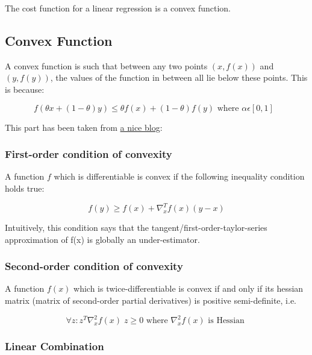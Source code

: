 The cost function for a linear regression is a convex function.

\subsection{Convex Function}

A convex function is such that between any two points $(x, f(x))$ and $(y, f(y))$, the values of the function in between all lie below these points. This is because:

\begin{equation}
    f(\theta x + (1-\theta)y) \leq \theta f(x) + (1-\theta)f(y) \text{ where $\alpha \epsilon [0, 1]$ }
\end{equation}

This part has been taken from \href{http://mathgotchas.blogspot.com/2011/10/why-is-error-function-minimized-in.html}{a nice blog}:

\subsubsection{First-order condition of convexity}

A function $f$ which is differentiable is convex if the following inequality condition holds true:

\begin{equation}
    f(y) \geq f(x) + \nabla_x^T f(x)(y-x) 
\end{equation}

Intuitively, this condition says that the tangent/first-order-taylor-series approximation of f(x) is globally an under-estimator.

\subsubsection{Second-order condition of convexity}

A function $f(x)$ which is twice-differentiable is convex if and only if its hessian matrix (matrix of second-order partial derivatives) is positive semi-definite, i.e.

\begin{equation}
    \forall z: z^T \nabla_x^2 f(x) \; z \geq 0 \text{ where } \nabla_x^2 f(x) \text{ is Hessian }
\end{equation}

\subsubsection{Linear Combination}

